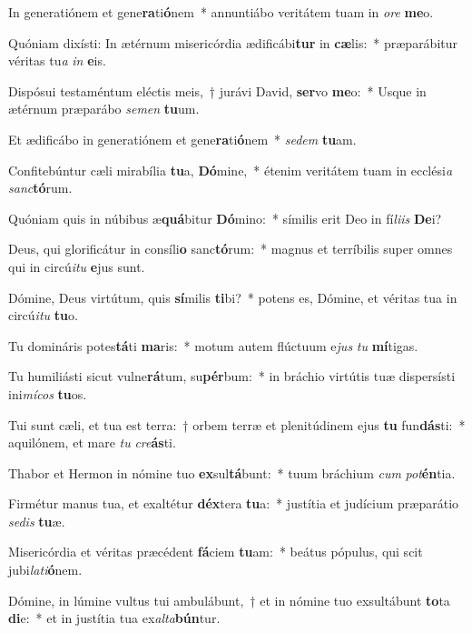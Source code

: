 \item In generatiónem et gene\textbf{ra}ti\textbf{ó}nem~* annuntiábo veritátem tuam in \textit{o}\textit{re} \textbf{me}o.
\item Quóniam dixísti: In ætérnum misericórdia ædificábi\textbf{tur} in \textbf{cæ}lis:~* præparábitur véritas tu\textit{a} \textit{in} \textbf{e}is.
\item Dispósui testaméntum eléctis meis,~† jurávi David, \textbf{ser}vo \textbf{me}o:~* Usque in ætérnum præparábo \textit{se}\textit{men} \textbf{tu}um.
\item Et ædificábo in generatiónem et gene\textbf{ra}ti\textbf{ó}nem~* \textit{se}\textit{dem} \textbf{tu}am.
\item Confitebúntur cæli mirabília \textbf{tu}a, \textbf{Dó}mine,~* étenim veritátem tuam in ecclési\textit{a} \textit{sanc}\textbf{tó}rum.
\item Quóniam quis in núbibus æ\textbf{quá}bitur \textbf{Dó}mino:~* símilis erit Deo in fí\textit{li}\textit{is} \textbf{De}i?
\item Deus, qui glorificátur in consíli\textbf{o} sanc\textbf{tó}rum:~* magnus et terríbilis super omnes qui in circú\textit{i}\textit{tu} \textbf{e}jus sunt.
\item Dómine, Deus virtútum, quis \textbf{sí}milis \textbf{ti}bi?~* potens es, Dómine, et véritas tua in circú\textit{i}\textit{tu} \textbf{tu}o.
\item Tu domináris potes\textbf{tá}ti \textbf{ma}ris:~* motum autem flúctuum e\textit{jus} \textit{tu} \textbf{mí}tigas.
\item Tu humiliásti sicut vulne\textbf{rá}tum, su\textbf{pér}bum:~* in bráchio virtútis tuæ dispersísti ini\textit{mí}\textit{cos} \textbf{tu}os.
\item Tui sunt cæli, et tua est terra:~† orbem terræ et plenitúdinem ejus \textbf{tu} fun\textbf{dás}ti:~* aquilónem, et mare \textit{tu} \textit{cre}\textbf{ás}ti.
\item Thabor et Hermon in nómine tuo \textbf{ex}sul\textbf{tá}bunt:~* tuum bráchium \textit{cum} \textit{pot}\textbf{én}tia.
\item Firmétur manus tua, et exaltétur \textbf{déx}tera \textbf{tu}a:~* justítia et judícium præparátio \textit{se}\textit{dis} \textbf{tu}æ.
\item Misericórdia et véritas præcédent \textbf{fá}ciem \textbf{tu}am:~* beátus pópulus, qui scit jubi\textit{la}\textit{ti}\textbf{ó}nem.
\item Dómine, in lúmine vultus tui ambulábunt,~† et in nómine tuo exsultábunt \textbf{to}ta \textbf{di}e:~* et in justítia tua ex\textit{al}\textit{ta}\textbf{bún}tur.
